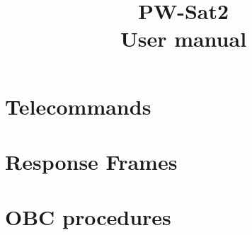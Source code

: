\documentclass{article}
\title{PW-Sat2\\User manual}
\author{}
\begin{document}
\maketitle

\newpage

\tableofcontents
\newpage

\section{Telecommands}






\section{Response Frames}


\section{OBC procedures}


\newpage
\todolist
\end{document}

